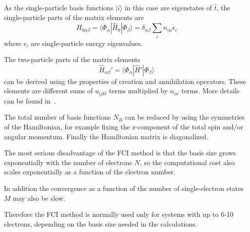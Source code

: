 As the single-particle basis functions $| i \rangle$ in this case are eigenstates of $\hat{t}$, the single-particle parts of the matrix elements are
\begin{equation}
 H_{0\alpha \beta} = \langle \Phi_{\alpha} |\hat{H}_0| \Phi_{\beta} \rangle = \delta_{\alpha \beta} \sum_i n_{\alpha i} \epsilon_i
\end{equation}
where $\epsilon_i$ are single-particle energy eigenvalues.

The two-particle parts of the matrix elements
\begin{equation}
 \hat{H}_{\alpha \beta}' = \langle \Phi_{\alpha} |\hat{H}' | \Phi_{\beta} \rangle 
\end{equation}
can be derived using the properties of creation and annihilation operators. These elements are different sums of $u_{ijkl}$ terms multiplied by $n_{\alpha i}$ terms.
More details can be found in~\cite{bardsenThesis}.

The total number of basis functions $N_B$ can be reduced by using the symmetries of the Hamiltonian, for example fixing the z-component of the total spin and/or angular momentum. Finally the Hamiltonian matrix is diagonalized.

The most serious disadvantage of the FCI method is that the basis size grows exponentially with the number of electrons $N$, so the computational cost also scales exponentially as a function of the electron number.

In addition the convergence as a function of the number of single-electron states $M$ may also be slow.

Therefore the FCI method is normally used only for systems with up to 6-10 electrons, depending on the basis size needed in the calculations.